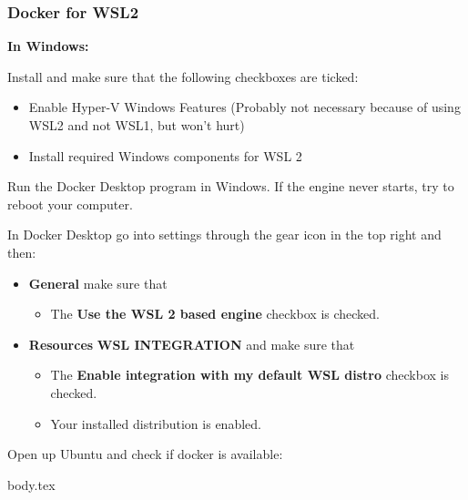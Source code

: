 \subsubsection{Docker for WSL2}

\textbf{In Windows:}


Install and make sure that the following checkboxes are ticked:
\begin{itemize}
    \item Enable Hyper-V Windows Features (Probably not necessary because of using WSL2 and not WSL1, but won't hurt)
    \item Install required Windows components for WSL 2
\end{itemize}

Run the Docker Desktop program in Windows. If the engine never starts, try to reboot your computer.

In Docker Desktop go into settings through the gear icon in the top right and then:
\begin{itemize}
    \item \textbf{General} make sure that
    \begin{itemize}
        \item The \textbf{Use the WSL 2 based engine} checkbox is checked.
    \end{itemize}
    \item \textbf{Resources} \ra \textbf{WSL INTEGRATION} and make sure that
    \begin{itemize}
        \item The \textbf{Enable integration with my default WSL distro} checkbox is checked.
        \item Your installed distribution is enabled.
    \end{itemize}
\end{itemize}

Open up Ubuntu and check if docker is available:


\ifdefined\wslRelevantDockerTest
{body.tex}
\fi